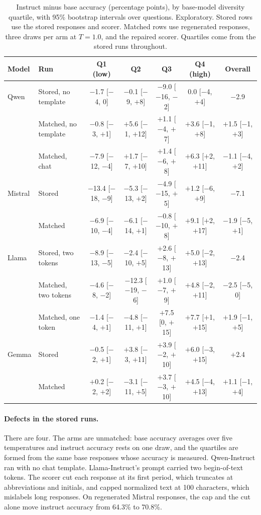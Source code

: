 \begin{table}[htbp]
\centering
\scriptsize
\setlength{\tabcolsep}{2pt}
\begin{tabular}{llccccc}
\toprule
Model & Run & Q1 (low) & Q2 & Q3 & Q4 (high) & Overall \\
\midrule
Qwen & Stored, no template & $-$1.7 [$-$4, 0] & $-$0.1 [$-$9, $+$8] & $-$9.0 [$-$16, $-$2] & 0.0 [$-$4, $+$4] & $-$2.9 \\
 & Matched, no template & $-$0.8 [$-$3, $+$1] & $+$5.6 [$-$1, $+$12] & $+$1.1 [$-$4, $+$7] & $+$3.6 [$-$1, $+$8] & $+$1.5 [$-$1, $+$3] \\
 & Matched, chat & $-$7.9 [$-$12, $-$4] & $+$1.7 [$-$7, $+$10] & $+$1.4 [$-$6, $+$8] & $+$6.3 [$+$2, $+$11] & $-$1.1 [$-$4, $+$2] \\
\midrule
Mistral & Stored & $-$13.4 [$-$18, $-$9] & $-$5.3 [$-$13, $+$2] & $-$4.9 [$-$15, $+$5] & $+$1.2 [$-$6, $+$9] & $-$7.1 \\
 & Matched & $-$6.9 [$-$10, $-$4] & $-$6.1 [$-$14, $+$1] & $-$0.8 [$-$10, $+$8] & $+$9.1 [$+$2, $+$17] & $-$1.9 [$-$5, $+$1] \\
\midrule
Llama & Stored, two tokens & $-$8.9 [$-$13, $-$5] & $-$2.4 [$-$10, $+$5] & $+$2.6 [$-$8, $+$13] & $+$5.0 [$-$2, $+$13] & $-$2.4 \\
 & Matched, two tokens & $-$4.6 [$-$8, $-$2] & $-$12.3 [$-$19, $-$6] & $+$1.0 [$-$7, $+$9] & $+$4.8 [$-$2, $+$11] & $-$2.5 [$-$5, 0] \\
 & Matched, one token & $-$1.4 [$-$4, $+$1] & $-$4.8 [$-$11, $+$1] & $+$7.5 [0, $+$15] & $+$7.7 [$+$1, $+$15] & $+$1.9 [$-$1, $+$5] \\
\midrule
Gemma & Stored & $-$0.5 [$-$2, $+$1] & $+$3.8 [$-$3, $+$11] & $+$3.9 [$-$2, $+$10] & $+$6.0 [$-$3, $+$15] & $+$2.4 \\
 & Matched & $+$0.2 [$-$2, $+$2] & $-$3.1 [$-$11, $+$5] & $+$3.7 [$-$3, $+$10] & $+$4.5 [$-$4, $+$13] & $+$1.1 [$-$1, $+$4] \\
\bottomrule
\end{tabular}
\caption{Instruct minus base accuracy (percentage points), by base-model diversity quartile, with 95\% bootstrap intervals over questions. Exploratory. Stored rows use the stored responses and scorer. Matched rows use regenerated responses, three draws per arm at $T=1.0$, and the repaired scorer. Quartiles come from the stored runs throughout.}
\label{tab:pred1-matched}
\end{table}

\paragraph{Defects in the stored runs.} There are four. The arms are unmatched: base accuracy averages over five temperatures and instruct accuracy rests on one draw, and the quartiles are formed from the same base responses whose accuracy is measured. Qwen-Instruct ran with no chat template. Llama-Instruct's prompt carried two begin-of-text tokens. The scorer cut each response at its first period, which truncates at abbreviations and initials, and capped normalized text at 100 characters, which mislabels long responses. On regenerated Mistral responses, the cap and the cut alone move instruct accuracy from 64.3\% to 70.8\%.

